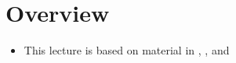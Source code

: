 \documentclass[11pt,twoside]{report}
\begin{document}



\section*{Overview} 

\begin{itemize}


\item This lecture is based on material in  \cite[Chapter 5.1]{chamberland:2023EF},  \cite[Chapter~7]{luenberger:1997}, and \cite{clarke:2013}


\end{itemize}



\end{document}

